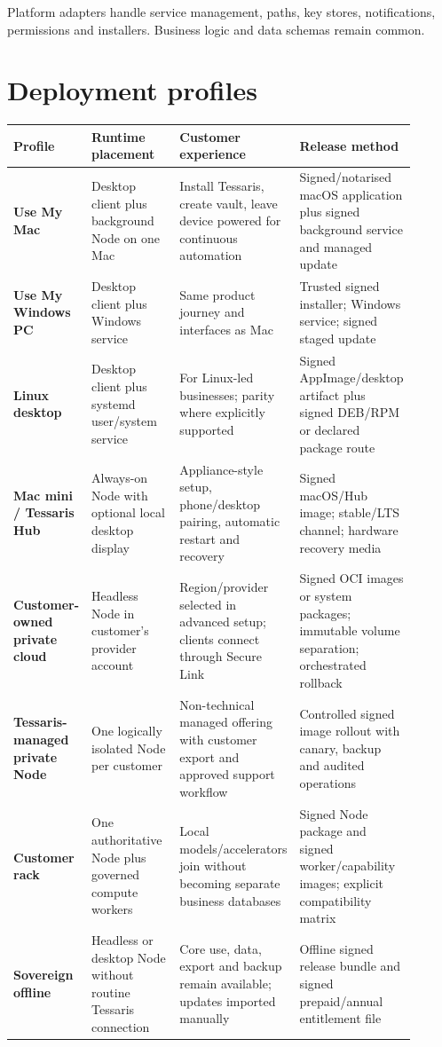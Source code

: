\documentclass[11pt]{article}
\begin{document}
Platform adapters handle service management, paths, key stores, notifications, permissions and installers. Business logic and data schemas remain common.

\section{Deployment profiles}

\begin{longtable}{>{\raggedright\arraybackslash\bfseries}p{0.18\linewidth} p{0.25\linewidth} p{0.25\linewidth} p{0.22\linewidth}}
\toprule
Profile & Runtime placement & Customer experience & Release method \\
\midrule
\endhead
Use My Mac & Desktop client plus background Node on one Mac & Install Tessaris, create vault, leave device powered for continuous automation & Signed/notarised macOS application plus signed background service and managed update \\
Use My Windows PC & Desktop client plus Windows service & Same product journey and interfaces as Mac & Trusted signed installer; Windows service; signed staged update \\
Linux desktop & Desktop client plus systemd user/system service & For Linux-led businesses; parity where explicitly supported & Signed AppImage/desktop artifact plus signed DEB/RPM or declared package route \\
Mac mini / Tessaris Hub & Always-on Node with optional local desktop display & Appliance-style setup, phone/desktop pairing, automatic restart and recovery & Signed macOS/Hub image; stable/LTS channel; hardware recovery media \\
Customer-owned private cloud & Headless Node in customer's provider account & Region/provider selected in advanced setup; clients connect through Secure Link & Signed OCI images or system packages; immutable volume separation; orchestrated rollback \\
Tessaris-managed private Node & One logically isolated Node per customer & Non-technical managed offering with customer export and approved support workflow & Controlled signed image rollout with canary, backup and audited operations \\
Customer rack & One authoritative Node plus governed compute workers & Local models/accelerators join without becoming separate business databases & Signed Node package and signed worker/capability images; explicit compatibility matrix \\
Sovereign offline & Headless or desktop Node without routine Tessaris connection & Core use, data, export and backup remain available; updates imported manually & Offline signed release bundle and signed prepaid/annual entitlement file \\
\bottomrule
\end{longtable}
\end{document}
